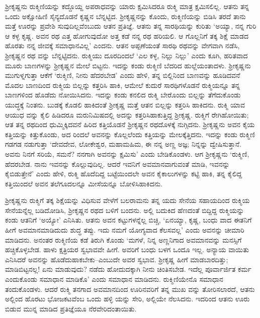 ಶ್ರೀಕೃಷ್ಣನು ರುಕ್ಮಿಣಿಯನ್ನು ಕದ್ದೊಯ್ದ ಅಪರಾಧವನ್ನು ಯಾರು ಕ್ಷಮಿಸಿದರೂ ರುಕ್ಮಿ ಮಾತ್ರ ಕ್ಷಮಿಸಲಿಲ್ಲ. ಆತನು ತನ್ನ ಒಂದು ಅಕ್ಷೋಹಿಣಿ ಸೈನ್ಯದೊಡನೆ ಕೃಷ್ಣನ ಬೆನ್ನಟ್ಟಿದ. ಶ್ರೀಕೃಷ್ಣನನ್ನು ಕೊಂದು, ರುಕ್ಮಿಣಿಯನ್ನು ಬಿಡಿಸಿ ತರದೆ ತಾನು ಮತ್ತೆ ಊರನ್ನು ಪ್ರವೇಶಿ ಸುವುದಿಲ್ಲವೆಂಬುದು ಆತನ ಪ್ರತಿಜ್ಞೆ. ಆತನು ತನ್ನ ಸಾರಥಿಯನ್ನು ಕುರಿತು ‘ಅಯ್ಯಾ, ನನ್ನ ಗುರಿ ಆ ಕಳ್ಳ ಕೃಷ್ಣ. ಅವನ ರಥ ಎತ್ತ ಹೋಗುವುದೋ ಅತ್ತ ಕಡೆ ನನ್ನ ರಥ ಹರಿಯಲಿ. ಆ ಗೊಲ್ಲನಿಗೆ ತಕ್ಕ ಶಿಕ್ಷೆ ಮಾಡದ ಹೊರತು ನನ್ನ ಜೀವಕ್ಕೆ ಸಮಾಧಾನವಿಲ್ಲ’ ಎಂದನು. ಆತನ ಅಪ್ಪಣೆಯಂತೆ ಸಾರಥಿ ರಥವನ್ನು ವೇಗವಾಗಿ ನಡೆಸಿ, ಶ್ರೀಕೃಷ್ಣನ ರಥ ವನ್ನು ಬೆನ್ನಟ್ಟಿದನು. ರುಕ್ಮಿಯು ದೂರದಿಂದಲೆ ‘ಎಲ ಕಳ್ಳ, ನಿಲ್ಲು ನಿಲ್ಲು’ ಎಂದು ಕೂಗಿ, ಹರಿತವಾದ ಮೂರು ಬಾಣಗಳನ್ನು ಶ್ರೀಕೃಷ್ಣನ ಮೇಲೆ ಬಿಟ್ಟನು. ಇದನ್ನು ಕಂಡು ರುಕ್ಮಿಣಿ ಬೆದರಿದ ಹುಲ್ಲೆಯಂತಾದಳು. ಶ್ರೀಕೃಷ್ಣನು ಮುಗುಳ್ನಗುತ್ತಾ ಆಕೆಗೆ ‘ರುಕ್ಮಿಣಿ, ನೀನು ಹೆದರಬೇಡ’ ಎಂದು ಹೇಳಿ, ತನ್ನ ಬಿಲ್ಲಿನಿಂದ ಬಾಣವನ್ನು ಹೂಡಿದವನೆ ಮೊದಲ ಬಾಣದಿಂದ ರುಕ್ಮಿಯ ಬಿಲ್ಲನ್ನು ಕತ್ತರಿಸಿ ಹಾಕಿ, ಆಮೇಲೆ ಕುದುರೆ ಸಾರಥಿಗಳೊಡನೆ ರುಕ್ಮಿಯನ್ನೂ ತನ್ನ ಬಾಣಗಳಿಂದ ಹೊಡೆದು ನೋಯಿಸಿದನು. ಇದನ್ನು ಕಂಡು ಕನಲಿದ ರುಕ್ಮಿ ಬೇರೊಂದು ಬಿಲ್ಲನ್ನು ತೆಗೆದುಕೊಂಡು ಯುದ್ಧಕ್ಕೆ ನಿಂತನು. ಬುಡಕ್ಕೆ ಕೊಡಲಿ ಹಾಕಿದಂತೆ ಶ್ರೀಕೃಷ್ಣ ಮತ್ತೆ ಆತನ ಬಿಲ್ಲನ್ನು ಕತ್ತರಿಸಿ ಹಾಕಿದನು. ರುಕ್ಮಿ ಯಾವ ಆಯುಧ ವನ್ನು ಕೈಲಿ ಹಿಡಿದರೂ ಮರುನಿಮಿಷದಲ್ಲಿ ಅದನ್ನು ಕತ್ತರಿಸಿಹಾಕುತ್ತಿದ್ದ ಶ್ರೀಕೃಷ್ಣ. ರುಕ್ಮಿಗೆ ರೇಗಿಹೋಯಿತು; ಆತ ತನ್ನ ರಥದಿಂದ ಧುಮ್ಮಿಕ್ಕಿದವನೆ ಹಿರಿದ ಕತ್ತಿಯೊಡನೆ ಶ್ರೀಕೃಷ್ಣನ ರಥದೊಳಕ್ಕೆ ನುಗ್ಗಿದನು. ಶ್ರೀಕೃಷ್ಣನು ಅವನ ಕೈಯ ಕತ್ತಿಯನ್ನು ಕಿತ್ತುಕೊಂಡು, ಅದ ರಿಂದಲೆ ಅವನನ್ನು ಕೊಲ್ಲಲೆಂದು ಕತ್ತಿಯನ್ನು ಮೇಲಕ್ಕೆತ್ತಿದನು. ಇದನ್ನು ಕಂಡು ರುಕ್ಮಿಣಿ ಗಡಗಡ ನಡುಗುತ್ತಾ ‘ದೇವದೇವ, ಲೋಕೇಶ್ವರ, ಮಹಾಮಹಿಮ, ಈ ನನ್ನ ಅಣ್ಣ ಅಜ್ಞ; ನಿನ್ನನ್ನು ದ್ವೇಷಿಸುತ್ತಾನೆ. ಅವನು ನಿನಗೆ ಸರಿಯೆ, ಸಮನೆ? ನನಗಾಗಿ ಅವನನ್ನು ಕ್ಷಮಿಸು’ ಎಂದು ಬೇಡಿಕೊಂಡಳು. ಆಗ ಶ್ರೀಕೃಷ್ಣನು ‘ರುಕ್ಮಿಣಿ, ಹೆದರಬೇಡ. ನಾನು ಇವನನ್ನು ಕೊಲ್ಲುವುದಿಲ್ಲ. ಆದರೆ ಇವನಿಗೆ ಅವಮಾನವಾಗುವಂತೆ ಮಾಡಿ, ಇವನನ್ನು ಕೈಬಿಡುತ್ತೇನೆ’ ಎಂದು ಹೇಳಿ, ರುಕ್ಮಿ ಹೊದೆದಿದ್ದ ಬಟ್ಟೆಯಿಂದಲೇ ಅವನ ಕೈಕಾಲುಗಳನ್ನು ಕಟ್ಟಿ ಹಾಕಿ, ತನ್ನ ಕೈಲಿದ್ದ ಕತ್ತಿಯಿಂದಲೆ ಅವನ ತಲೆಗೂದಲನ್ನೂ ಮೀಸೆಯನ್ನೂ ಬೋಳಿಸಿಹಾಕಿದನು.

ಶ್ರೀಕೃಷ್ಣನು ರುಕ್ಮಿಗೆ ತಕ್ಕ ಶಿಕ್ಷೆಯನ್ನು ವಿಧಿಸುವ ವೇಳೆಗೆ ಬಲರಾಮನು ತನ್ನ ಯದು ಸೇನೆಯ ಸಹಾಯದಿಂದ ರುಕ್ಮಿಯ ಸೇನೆಯನ್ನೆಲ್ಲ ಬಡಿದೋಡಿಸಿ, ಶ್ರೀಕೃಷ್ಣನ ರಥದ ಬಳಿಗೆ ಬಂದನು. ಅಲ್ಲಿ ಬದುಕಿದ ಹೆಣದಂತೆ ಬಿದ್ದಿದ್ದ ರುಕ್ಮಿಯನ್ನು ಕಂಡು ಆತನಿಗೆ ‘ಅಯ್ಯೋ’ ಎನಿಸಿತು. ಆತನು ಅವನ ಕಟ್ಟುಗಳನ್ನೆಲ್ಲ ಬಿಚ್ಚಿ, ‘ಏನಯ್ಯಾ, ಕೃಷ್ಣ, ಬಂಧು ವಾದ ಈತನಿಗೆ ಹೀಗೆ ಅವಮಾನಮಾಡಿದುದು ಶುದ್ಧ ತಪ್ಪು. ಇದು ನಮಗೆ ಯೋಗ್ಯವಾದ ಕೆಲಸವಲ್ಲ’ ಎಂದು ಅವನನ್ನು ಚೀಮಾರಿ ಮಾಡಿದನು. ಅನಂತರ ರುಕ್ಮಿಣಿಯ ಕಡೆ ತಿರುಗಿ ಕೊಂಡು ‘ಮಗಳೆ, ನಿನ್ನ ಅಣ್ಣನಿಗಾದ ಅವಮಾನವನ್ನು ಮನಸ್ಸಿಗೆ ಹಚ್ಚಿಕೊಳ್ಳಬೇಡ. ಹಾಳು ಕ್ಷತ್ರಿಯರ ಸ್ವಭಾವವೇ ಹೀಗೆ. ಅವರಿಗೆ ಬಂಧು ಬಳಗ ಒಂದೂ ಇಲ್ಲ. ಅನ್ಯಾಯ ವಾಯಿತು ಎನಿಸಿದರೆ ಅವನನ್ನು ಹೊಡೆದುಹಾಕಬೇಕು–ಎಂಬುದೇ ಅವರ ಸ್ವಭಾವ. ಶ್ರೀಕೃಷ್ಣ ಹೀಗೆ ಮಾಡಬಾರದಿತ್ತು; ಮಾಡಿಬಿಟ್ಟನಲ್ಲ! ಏನು ಮಾಡುವುದು? ನಡೆದು ಹೋದುದಕ್ಕಾಗಿ ನೀನು ಚಿಂತಿಸಬೇಡ. ಇದೆಲ್ಲ ಪೂರ್ವಾರ್ಜಿತ ಕರ್ಮ ಎಂದುಕೊಂಡು ಸಮಾಧಾನ ಮಾಡಿಕೊ’ ಎಂದು ಸಮಾಧಾನ ಮಾಡಿದನು. ರುಕ್ಮಿಣಿಯೇನೊ ಸಮಾಧಾನ ತಂದುಕೊಂಡಳು. ಆದರೆ ರುಕ್ಮಿ ತನಗಾದ ಅವಮಾನದಿಂದ ಊರಿನವರಿಗೆ ತನ್ನ ಮುಖ ವನ್ನು ತೋರಿಸಲಾರದೆ, ಆತನು ಅಲ್ಲಿಂದ ಹೊರಟು ಭೋಜಕಟವೆಂಬ ಒಂದು ಹಳ್ಳಿ ಯನ್ನು ಸೇರಿ, ಅಲ್ಲಿಯೇ ನೆಲಸಿದನು. ಇದರಿಂದ ಆತನು ಊರು ಬಿಡುವ ಮುನ್ನ ಮಾಡಿದ ಪ್ರತಿಜ್ಞೆಯೂ ನೆರವೇರಿದಂತಾಯಿತು.

